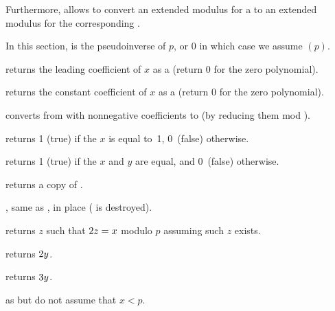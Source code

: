 Furthermore,  allows to convert an extended modulus for
a  to an extended modulus for the corresponding .


In this section,  is the pseudoinverse of $p$, or $0$ in which case
we assume $(p)$.

 returns the leading coefficient of $x$ as a
 (return $0$ for the zero polynomial).

 returns the constant coefficient of $x$ as a
 (return $0$ for the zero polynomial).

 converts from  with
nonnegative coefficients to  (by reducing them mod ).

 returns 1 (true) if the  $x$ is equal
to~1, 0~(false) otherwise.

 returns 1 (true) if the  $x$
and $y$ are equal, and 0~(false) otherwise.

 returns a copy of .




, same as , in place
( is destroyed).



 returns $z$ such that $2\*z = x$ modulo
$p$ assuming such $z$ exists.





 returns $2\*y$.

 returns $3\*y$.

 as  but do not
assume that $x<p$.

